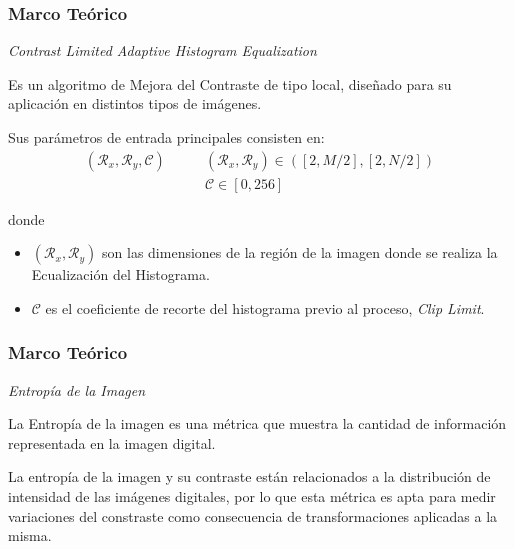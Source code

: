 \documentclass[usenames,dvipsnames]{beamer}
\begin{document}
\begin{frame} 
\frametitle{Marco Teórico} 
\begin{exampleblock}{\textit{Contrast Limited Adaptive Histogram Equalization}}

Es un algoritmo de Mejora del Contraste de tipo local, diseñado para su aplicación en distintos tipos de imágenes. 

Sus parámetros de entrada principales consisten en:
\begin{equation}
\begin{split}
(\mathscr{R}_x, \mathscr{R}_y, \mathscr{C}) & \qquad (\mathscr{R}_x, \mathscr{R}_y) \in ([2,M/2],[2,N/2]) \\
											& \qquad \mathscr{C} \in [0,256]
\end{split}
\end{equation}


donde
\end{exampleblock}
\centering

\begin{itemize}
	\item $(\mathscr{R}_x, \mathscr{R}_y)$ son las dimensiones de la región de la imagen donde se realiza la Ecualización del Histograma.
	\item $\mathscr{C}$ es el coeficiente de recorte del histograma previo al proceso, \textit{Clip Limit}. 
\end{itemize}


\end{frame}

\begin{frame} 
\frametitle{Marco Teórico} 
\begin{exampleblock}{\textit{Entropía de la Imagen}}

La Entropía de la imagen es una métrica que muestra la cantidad de información representada en la imagen digital.

La entropía de la imagen y su contraste están relacionados a la distribución de intensidad de las imágenes digitales, por lo que esta métrica es apta para medir variaciones del constraste como consecuencia de transformaciones aplicadas a la misma.

\end{exampleblock}

\centering

\end{frame}
\end{document}
